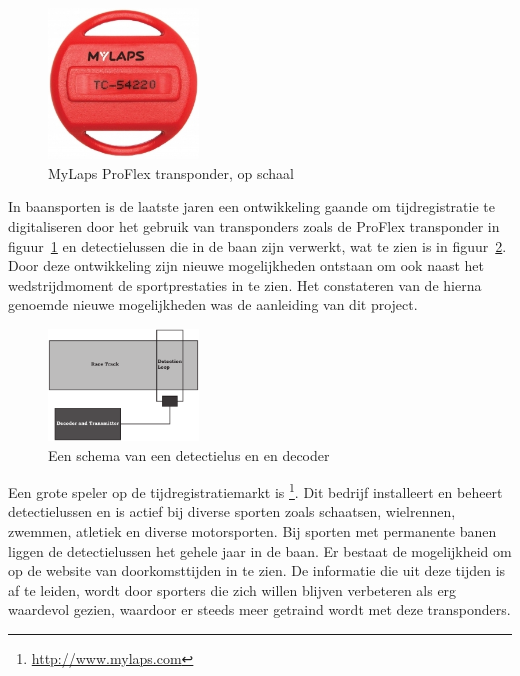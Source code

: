 \newcommand{\aanleiding}{}

\begin{figure}
  \begin{center}
    \includegraphics[width=4cm]{style/images/transponder}
  \end{center}
  \caption{MyLaps ProFlex transponder, op schaal}
  \label{fig:transponder}
  \vspace{15mm}
\end{figure}

In baansporten is de laatste jaren een ontwikkeling gaande om tijdregistratie te digitaliseren door het gebruik van transponders zoals de \mylaps ProFlex transponder in figuur~\ref{fig:transponder} en detectielussen die in de baan zijn verwerkt, wat te zien is in figuur~\ref{fig:detection-loop}. Door deze ontwikkeling zijn nieuwe mogelijkheden ontstaan om ook naast het wedstrijdmoment de sportprestaties in te zien. Het constateren van de hierna genoemde nieuwe mogelijkheden was de aanleiding van dit project.

\begin{figure}
  \begin{center}
    \includegraphics[width=4cm]{style/images/DetectionLoop}
  \end{center}
  \caption{Een schema van een detectielus en en decoder}
  \label{fig:detection-loop}
  \vspace{5mm}
\end{figure}

Een grote speler op de tijdregistratiemarkt is \mylaps\footnote{\url{http://www.mylaps.com}}. Dit bedrijf installeert en beheert detectielussen en is actief bij diverse sporten zoals schaatsen, wielrennen, zwemmen, atletiek en diverse motorsporten. Bij sporten met permanente banen liggen de detectielussen het gehele jaar in de baan. Er bestaat de mogelijkheid om op de website van \mylaps doorkomsttijden in te zien. De informatie die uit deze tijden is af te leiden, wordt door sporters die zich willen blijven verbeteren als erg waardevol gezien, waardoor er steeds meer getraind wordt met deze transponders.

